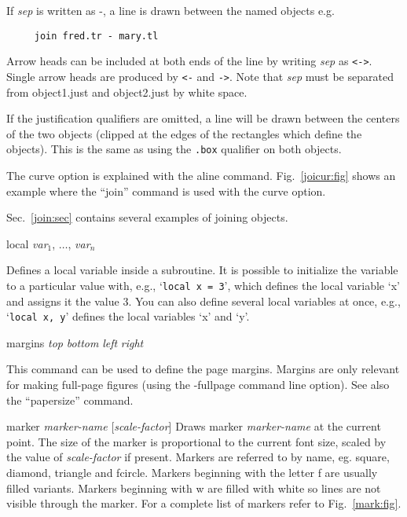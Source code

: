 \begin{commanddescription}
If {\it sep} is written as {\sf -}, a line is drawn between the named objects e.g.

\begin{Verbatim}
     join fred.tr - mary.tl
\end{Verbatim}

Arrow heads can be included at both ends of the line by writing {\it sep} as \verb#<->#. Single arrow heads are produced by \verb#<-# and \verb#->#.  Note that {\it sep} must be separated from object1.just and object2.just by white space.

If the justification qualifiers are omitted, a line will be drawn between the centers of the two objects (clipped at the edges of the rectangles which define the objects). This is the same as using the \verb#.box# qualifier on both objects.

The {\sf curve} option is explained with the {\sf aline} command. Fig.~\ref{joicur:fig} shows an example where the ``join'' command is used with the curve option.

Sec.~\ref{join:sec} contains several examples of joining objects.

\item[{\sf local {\it var}$_1$, $\ldots$, {\it var}$_n$}]

Defines a local variable inside a subroutine. It is possible to initialize the variable to a particular value with, e.g., `\texttt{local x = 3}', which defines the local variable `x' and assigns it the value 3. You can also define several local variables at once, e.g., `\texttt{local x, y}' defines the local variables `x' and `y'.

\item[{\sf margins {\it top} {\it bottom} {\it left} {\it right}}]

This command can be used to define the page margins. Margins are only relevant for making full-page figures (using the -fullpage command line option). See also the ``papersize'' command.

\item[{\sf marker {\it marker-name} [{\it scale-factor}]}  ]
  Draws marker {\it marker-name} at the current point.  The size of the marker
is proportional to the current font size, scaled by the value of
{\it scale-factor} if present.  Markers are referred to by name, eg.
{\sf square}, {\sf diamond}, {\sf triangle} and {\sf fcircle}.  Markers
beginning with the letter {\sf f} are usually filled variants.  Markers
beginning with {\sf w} are filled with white so lines are not visible
through the marker. For a complete
list of markers refer to Fig.~\ref{mark:fig}.


\end{commanddescription}
